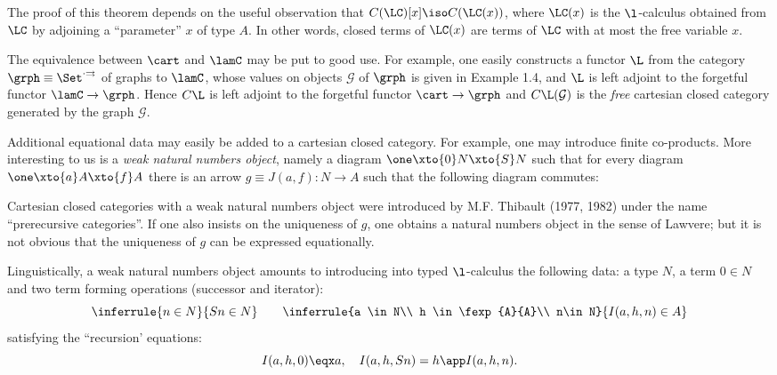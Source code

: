 The proof of this theorem depends on the useful observation that
$C(\LC)[x] \iso C(\LC(x))$, where $\LC(x)$ is the $\l$-calculus
obtained from $\LC$ by adjoining a ``parameter'' $x$ of type $A$.
In other words, closed terms of
$\LC(x)$ are terms of $\LC$ with at most the free variable $x$.

The equivalence between $\cart$ and $\lamC$ may be put to good use. For
example, one easily constructs a functor $\L$ from the category
$\grph \equiv \Set^{\cdot\rightrightarrows}$
of graphs to $\lamC$, whose values on objects $\mathcal G$ of $\grph$
is given in Example 1.4, and $\L$ is left adjoint to the forgetful functor
$\lamC \to \grph$. Hence $C\L$ is left adjoint to the forgetful functor
$\cart \to \grph$ and $C\L(\mathcal G)$ is the {\em free} 
cartesian closed category generated by the graph $\mathcal G$.

Additional equational data may easily be added to a cartesian closed
category. For example, one may introduce finite co-products. More interesting
to us is a {\em weak natural numbers object}, namely a diagram 
$\one \xto{0} N \xto{S} N$ such that for every diagram
$\one \xto{a} A \xto{f} A$ there is an arrow $g \equiv J(a,f) : N \to A$ such that
the following diagram commutes:

\begin{center}
\end{center}

Cartesian closed categories with a weak natural numbers object were introduced
by M.F. Thibault (1977, 1982) under the name ``prerecursive categories''. If
one also insists on the uniqueness of $g$, one obtains a natural numbers object
in the sense of Lawvere; but it is not obvious that the uniqueness of $g$ can
be expressed equationally.

Linguistically, a weak natural numbers object amounts to introducing into
typed $\l$-calculus the following data: a type $N$, a term $0 \in N$ and two term
forming operations (successor and iterator):
\[
\inferrule{n \in N}{Sn \in N} \qquad 
\inferrule{a \in N\\ h \in \fexp{A}{A}\\ n\in N}{I(a, h, n) \in A}
\]
satisfying the ``recursion' equations:
\[
I(a,h,0) \eqx a, \quad I(a,h,Sn) = h \app I(a,h,n) .
\]


